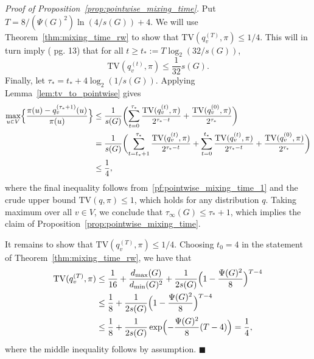 \documentclass[twoside,11pt]{article}
\newcommand{\1}{\mathbf{1}}
\newcommand{\qed}{\hfill $\blacksquare$}
\begin{document}
\noindent\emph{Proof of Proposition~\ref{prop:pointwise_mixing_time}.}
Put $T = 8/(\Psi(G)^2) \ln(4/s(G)) + 4$. We will use Theorem~\ref{thm:mixing_time_rw} to show that $\mathrm{TV}(q_v^{(T)},\pi) \leq 1/4$. This will in turn imply (\cite{montenegro2002} pg. 13) that for all $t \geq t_{\ast} := T \log_2(32/s(G))$,
\begin{equation}
\label{pf:pointwise_mixing_time_1}
\mathrm{TV}(q_v^{(t)},\pi) \leq \frac{1}{32}s(G).
\end{equation}
Finally, let $\tau_{\ast} = t_{\ast} + 4\log_2(1/s(G))$. Applying Lemma~\ref{lem:tv_to_pointwise} gives
\begin{align*}
\max_{u \in V} \Bigl\{\frac{\pi(u) - q_v^{(\tau_{\ast} + 1)}(u)}{\pi(u)}\Bigr\} & \leq \frac{1}{s(G)}\biggl(\sum_{t = 0}^{\tau_{\ast}} \frac{\mathrm{TV}(q_v^{(t)}, \pi)}{2^{\tau_{\ast} - t}} + \frac{\mathrm{TV}(q_v^{(0)}, \pi)}{2^{\tau_{\ast}}}\biggr) \\
& = \frac{1}{s(G)}\biggl(\sum_{t = t_{\ast} + 1}^{\tau_{\ast}} \frac{\mathrm{TV}(q_v^{(t)}, \pi)}{2^{\tau_{\ast} - t}} + \sum_{t = 0}^{t_{\ast}} \frac{\mathrm{TV}(q_v^{(t)}, \pi)}{2^{\tau_{\ast} - t}} + \frac{\mathrm{TV}(q_v^{(0)}, \pi)}{2^{\tau_{\ast}}}\biggr) \\
& \leq \frac{1}{4},
\end{align*}
where the final inequality follows from~\eqref{pf:pointwise_mixing_time_1} and the crude upper bound $\mathrm{TV}(q,\pi) \leq 1$, which holds for any distribution $q$. Taking maximum over all $v \in V$, we conclude that $\tau_{\infty}(G) \leq \tau_{\ast} + 1$, which implies the claim of Proposition~\ref{prop:pointwise_mixing_time}. 

It remains to show that $\mathrm{TV}(q_v^{(T)},\pi) \leq 1/4$. Choosing $t_0 = 4$ in the statement of Theorem~\ref{thm:mixing_time_rw}, we have that
\begin{align*}
\mathrm{TV}(q_v^{(T)},\pi) & \leq \frac{1}{16} + \frac{d_{\max}(G)}{d_{\min}(G)^2} + \frac{1}{2s(G)} \Bigl(1 - \frac{\Psi(G)^2}{8}\Bigr)^{T - 4} \\
& \leq \frac{1}{8} + \frac{1}{2s(G)} \Bigl(1 - \frac{\Psi(G)^2}{8}\Bigr)^{T - 4} \\
& \leq \frac{1}{8} + \frac{1}{2s(G)} \exp\Bigl(-\frac{\Psi(G)^2}{8}(T - 4)\Bigr) = \frac{1}{4},
\end{align*}
where the middle inequality follows by assumption. \qed \\ 
\end{document}

